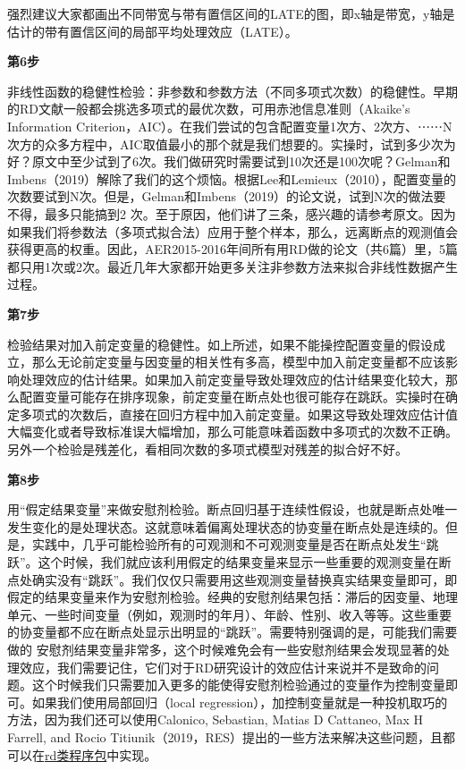 \documentclass[cn,12pt,math=newtx,citestyle=gb7714-2015,bibstyle=gb7714-2015]{elegantbook}
\begin{document}
	强烈建议大家都画出不同带宽与带有置信区间的LATE的图，即x轴是带宽，y轴是估计的带有置信区间的局部平均处理效应（LATE）。
	
	
		\textbf{第6步}
	
	非线性函数的稳健性检验：非参数和参数方法（不同多项式次数）的稳健性。早期的RD文献一般都会挑选多项式的最优次数，可用赤池信息准则（Akaike's Information Criterion，AIC）。在我们尝试的包含配置变量1次方、2次方、⋯⋯N次方的众多方程中，AIC取值最小的那个就是我们想要的。实操时，试到多少次为好？原文中至少试到了6次。我们做研究时需要试到10次还是100次呢？Gelman和Imbens（2019）解除了我们的这个烦恼。根据Lee和Lemieux（2010），配置变量的次数要试到N次。但是，Gelman和Imbens（2019）的论文说，试到N次的做法要不得，最多只能搞到2 次。至于原因，他们讲了三条，感兴趣的请参考原文。因为如果我们将参数法（多项式拟合法）应用于整个样本，那么，远离断点的观测值会获得更高的权重。因此，AER2015-2016年间所有用RD做的论文（共6篇）里，5篇都只用1次或2次。最近几年大家都开始更多关注非参数方法来拟合非线性数据产生过程。
	
	\textbf{第7步}
	
	检验结果对加入前定变量的稳健性。如上所述，如果不能操控配置变量的假设成立，那么无论前定变量与因变量的相关性有多高，模型中加入前定变量都不应该影响处理效应的估计结果。如果加入前定变量导致处理效应的估计结果变化较大，那么配置变量可能存在排序现象，前定变量在断点处也很可能存在跳跃。实操时在确定多项式的次数后，直接在回归方程中加入前定变量。如果这导致处理效应估计值大幅变化或者导致标准误大幅增加，那么可能意味着函数中多项式的次数不正确。另外一个检验是残差化，看相同次数的多项式模型对残差的拟合好不好。
	
	\textbf{第8步}
	
	用“假定结果变量”来做安慰剂检验。断点回归基于连续性假设，也就是断点处唯一发生变化的是处理状态。这就意味着偏离处理状态的协变量在断点处是连续的。但是，实践中，几乎可能检验所有的可观测和不可观测变量是否在断点处发生“跳跃”。这个时候，我们就应该利用假定的结果变量来显示一些重要的观测变量在断点处确实没有“跳跃”。我们仅仅只需要用这些观测变量替换真实结果变量即可，即假定的结果变量来作为安慰剂检验。经典的安慰剂结果包括：滞后的因变量、地理单元、一些时间变量（例如，观测时的年月）、年龄、性别、收入等等。这些重要的协变量都不应在断点处显示出明显的“跳跃”。需要特别强调的是，可能我们需要做的 安慰剂结果变量非常多，这个时候难免会有一些安慰剂结果会发现显著的处理效应，我们需要记住，它们对于RD研究设计的效应估计来说并不是致命的问题。这个时候我们只需要加入更多的能使得安慰剂检验通过的变量作为控制变量即可。如果我们使用局部回归（local regression），加控制变量就是一种投机取巧的方法，因为我们还可以使用Calonico, Sebastian, Matias D Cattaneo, Max H Farrell, and Rocio Titiunik（2019，RES）提出的一些方法来解决这些问题，且都可以在\href{https://rdpackages.github.io/}{rd类程序包}中实现。
	
\end{document}

